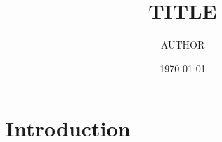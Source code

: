 \documentclass[11pt]{article}
\title{{{TITLE}}}
\author{{{AUTHOR}}}
\date{\today}
\begin{document}
\maketitle

\section{Introduction}
\end{document}
